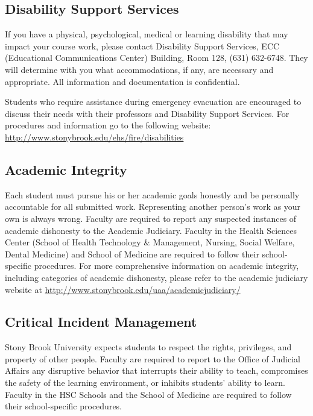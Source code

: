 \subsection{Disability Support Services}

If you have a physical, psychological, medical or learning disability that may impact your course work, please contact Disability Support Services, ECC (Educational Communications Center) Building, Room 128, (631) 632-6748. They will determine with you what accommodations, if any, are necessary and appropriate. All information and documentation is confidential.

Students who require assistance during emergency evacuation are encouraged to discuss their needs with their professors and Disability Support Services.
For procedures and information go to the following website:
\url{http://www.stonybrook.edu/ehs/fire/disabilities}

\subsection{Academic Integrity}

Each student must pursue his or her academic goals honestly and be personally accountable for all submitted work. Representing another person's work as your own is always wrong.  Faculty are required to report any suspected instances of academic dishonesty to the Academic Judiciary.  Faculty in the Health Sciences Center (School of Health Technology \& Management, Nursing, Social Welfare, Dental Medicine) and School of Medicine are required to follow their school-specific procedures. For more comprehensive information on academic integrity, including categories of academic dishonesty, please refer to the academic judiciary website at
\url{http://www.stonybrook.edu/uaa/academicjudiciary/}

\subsection{Critical Incident Management}

Stony Brook University expects students to respect the rights, privileges, and property of other people. Faculty are required to report to the Office of Judicial Affairs any disruptive behavior that interrupts their ability to teach, compromises the safety of the learning environment, or inhibits students' ability to learn.  Faculty in the HSC Schools and the School of Medicine are required to follow their school-specific procedures.
